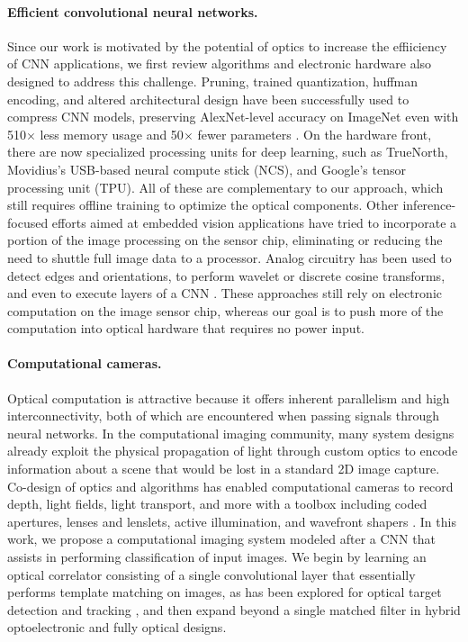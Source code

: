 \paragraph{Efficient convolutional neural networks.} 
Since our work is motivated by the potential of optics to increase the effiiciency of CNN applications, we first review algorithms and electronic hardware also designed to address this challenge. Pruning, trained quantization, huffman encoding, and altered architectural design have been successfully used to compress CNN models,  preserving AlexNet-level accuracy on ImageNet even with 510$\times$ less memory usage and 50$\times$ fewer parameters \cite{han2015deep,iandola2016squeezenet}. On the hardware front, there are now specialized processing units for deep learning, such as TrueNorth, Movidius's USB-based neural compute stick (NCS), and Google's tensor processing unit (TPU). All of these are complementary to our approach, which still requires offline training to optimize the optical components. Other inference-focused efforts aimed at embedded vision applications have tried to incorporate a portion of the image processing on the sensor chip, eliminating or reducing the need to shuttle full image data to a processor. Analog circuitry has been used to detect edges and orientations, to perform wavelet or discrete cosine transforms, and even to execute layers of a CNN \cite{gruev2002implementation,likamwa2016redeye}. These approaches still rely on electronic computation on the image sensor chip, whereas our goal is to push more of the computation into optical hardware that requires no power input. 

\paragraph{Computational cameras.} Optical computation is attractive because it offers inherent parallelism and high interconnectivity, both of which are encountered when passing signals through neural networks. In the computational imaging community, many system designs already exploit the physical propagation of light through custom optics to encode information about a scene that would be lost in a standard 2D image capture. Co-design of optics and algorithms has enabled computational cameras to record depth, light fields, light transport, and more with a toolbox including coded apertures, lenses and lenslets, active illumination, and wavefront shapers \cite{ng2005light,levin2007image,mcguire2007optical,o2010optical,chang2016variable}. In this work, we propose a computational imaging system modeled after a CNN that assists in performing classification of input images. We begin by learning an optical correlator consisting of a single convolutional layer that essentially performs template matching on images, as has been explored for optical target detection and tracking \cite{manzur2012optical,javidi1995optical}, and then expand beyond a single matched filter in hybrid optoelectronic and fully optical designs.

